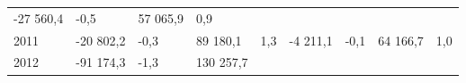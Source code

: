 \begin{longtable}[]{@{}lllllllll@{}}
\begin{minipage}[t]{0.12\columnwidth}
-27 560,4\strut
\end{minipage} & \begin{minipage}[t]{0.06\columnwidth}\raggedright
-0,5\strut
\end{minipage} & \begin{minipage}[t]{0.08\columnwidth}\raggedright
57 065,9\strut
\end{minipage} & \begin{minipage}[t]{0.06\columnwidth}\raggedright
0,9\strut
\end{minipage}\tabularnewline
\begin{minipage}[t]{0.05\columnwidth}\raggedright
2011\strut
\end{minipage} & \begin{minipage}[t]{0.10\columnwidth}\raggedright
-20 802,2\strut
\end{minipage} & \begin{minipage}[t]{0.06\columnwidth}\raggedright
-0,3\strut
\end{minipage} & \begin{minipage}[t]{0.17\columnwidth}\raggedright
89 180,1\strut
\end{minipage} & \begin{minipage}[t]{0.06\columnwidth}\raggedright
1,3\strut
\end{minipage} & \begin{minipage}[t]{0.12\columnwidth}\raggedright
-4 211,1\strut
\end{minipage} & \begin{minipage}[t]{0.06\columnwidth}\raggedright
-0,1\strut
\end{minipage} & \begin{minipage}[t]{0.08\columnwidth}\raggedright
64 166,7\strut
\end{minipage} & \begin{minipage}[t]{0.06\columnwidth}\raggedright
1,0\strut
\end{minipage}\tabularnewline
\begin{minipage}[t]{0.05\columnwidth}\raggedright
2012\strut
\end{minipage} & \begin{minipage}[t]{0.10\columnwidth}\raggedright
-91 174,3\strut
\end{minipage} & \begin{minipage}[t]{0.06\columnwidth}\raggedright
-1,3\strut
\end{minipage} & \begin{minipage}[t]{0.17\columnwidth}\raggedright
130 257,7\strut
\end{minipage} & \begin{minipage}[t]{0.06\columnwidth}\raggedright

\end{minipage}
\end{longtable}
